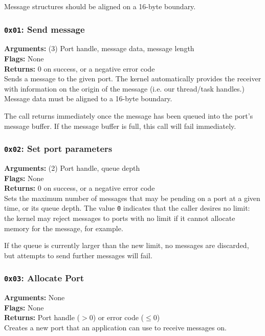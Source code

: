 \documentclass[11pt]{article}
\begin{document}
Message structures should be aligned on a 16-byte boundary.

\subsubsection{{\tt 0x01}: Send message}
\textbf{Arguments:} (3) Port handle, message data, message length \\
\textbf{Flags:} None \\
\textbf{Returns:} 0 on success, or a negative error code \\

Sends a message to the given port. The kernel automatically provides the receiver with information on the origin of the message (i.e. our thread/task handles.) Message data must be aligned to a 16-byte boundary.

The call returns immediately once the message has been queued into the port's message buffer. If the message buffer is full, this call will fail immediately.

\subsubsection{{\tt 0x02}: Set port parameters}
\textbf{Arguments:} (2) Port handle, queue depth \\
\textbf{Flags:} None \\
\textbf{Returns:} 0 on success, or a negative error code \\

Sets the maximum number of messages that may be pending on a port at a given time, or its queue depth. The value \texttt{0} indicates that the caller desires no limit: the kernel may reject messages to ports with no limit if it cannot allocate memory for the message, for example.

If the queue is currently larger than the new limit, no messages are discarded, but attempts to send further messages will fail.

\subsubsection{{\tt 0x03}: Allocate Port}
\textbf{Arguments:} None \\
\textbf{Flags:} None \\
\textbf{Returns:} Port handle ($>0$) or error code ($\leq0$) \\

Creates a new port that an application can use to receive messages on.
\end{document}
